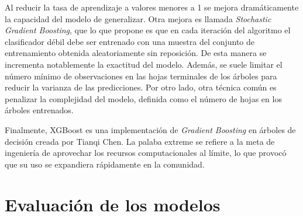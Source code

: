 Al reducir la tasa de aprendizaje a valores menores a 1 se mejora dramáticamente la capacidad del modelo de generalizar. Otra mejora es llamada \textit{Stochastic Gradient Boosting}, que lo que propone es que en cada iteración del algoritmo el clasificador débil debe ser entrenado con una muestra del conjunto de entrenamiento obtenida aleatoriamente sin reposición. De esta manera se incrementa notablemente la exactitud del modelo. Además, se suele limitar el número mínimo de observaciones en las hojas terminales de los árboles para reducir la varianza de las predicciones. Por otro lado, otra técnica común es penalizar la complejidad del modelo, definida como el número de hojas en los árboles entrenados.

Finalmente, XGBoost es una implementación de \textit{Gradient Boosting} en árboles de decisión creada por Tianqi Chen. La palaba extreme se refiere a la meta de ingeniería de aprovechar los recursos computacionales al límite, lo que provocó que su uso se expandiera rápidamente en la comunidad.





\section{Evaluación de los modelos}

